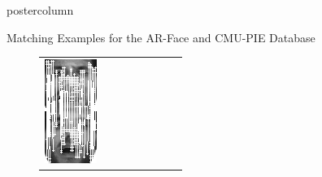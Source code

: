 \documentclass[final,hyperref={pdfpagelabels=false}]{beamer}
\begin{document}
\begin{frame}
\begin{columns}
\begin{column}{.49\textwidth}
\begin{beamercolorbox}[center,wd=\textwidth]{postercolumn}
\begin{minipage}[T]{.95\textwidth}
{\begin{block}{Matching Examples for the AR-Face and CMU-PIE Database}
\begin{figure}
\begin{tabular}{p{.09\linewidth} | p{.12\linewidth} | p{.12\linewidth} | p{.12\linewidth} || p{.12\linewidth} | p{.12\linewidth} | p{.12\linewidth} | p{.09\linewidth} }
                  \includegraphics[width=1.0\linewidth]{paper/bmvc09-surf/figures/matchings/arface-usift/grid_m-005-17.pgm--m-005-4}
                  &

\end{tabular}
\end{figure}
\end{block}}
\end{minipage}
\end{beamercolorbox}
\end{column}
\end{columns}
\end{frame}
\end{document}
